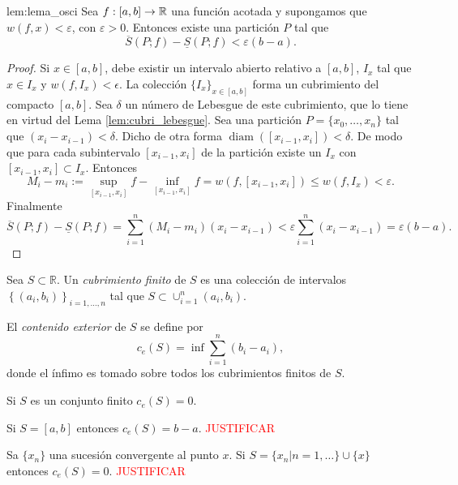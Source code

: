 \begin{lema}{lem:lema_osci} Sea $f:[a,b]\to\mathbb{R}$ una función acotada y supongamos que   $w(f,x)<\varepsilon$, con $\varepsilon>0$. Entonces existe una partición $P$ tal que 
\begin{equation}\label{eq:lema_oscila}
 \overline{S}(P;f)-\underline{S}(P;f)<\varepsilon(b-a).
\end{equation}
 
\end{lema}
\begin{proof} Si $x\in [a,b]$, debe existir un intervalo abierto relativo a $[a,b]$,  $I_x$ tal que $x\in I_x$ y $w(f,I_x)<\epsilon$. La colección $\{I_x\}_{x\in [a,b]}$ forma un cubrimiento del compacto $[a,b]$. Sea $\delta$ un número de Lebesgue de este cubrimiento, que lo tiene en virtud del Lema \ref{lem:cubri_lebesgue}. Sea una partición $P=\{x_0,\ldots,x_n\}$ tal que $(x_i-x_{i-1})<\delta$. Dicho de otra forma $\operatorname{diam}( [x_{i-1},x_i])<\delta$. De modo que para cada subintervalo $[x_{i-1},x_i]$ de la partición existe un $I_x$ con $[x_{i-1},x_i]\subset I_x$. Entonces 
\[
 M_i-m_i:=\sup\limits_{[x_{i-1},x_i]} f-\inf\limits_{[x_{i-1},x_i]} f=w(f,[x_{i-1},x_i])\leq w(f,I_x)<\varepsilon.
\]
Finalmente
\[
 \overline{S}(P;f)-\underline{S}(P;f)=\sum_{i=1}^n( M_i-m_i)(x_i-x_{i-1})<\varepsilon\sum_{i=1}^n(x_i-x_{i-1})=\varepsilon(b-a).
\]


 
\end{proof}





 \begin{definicion}{} Sea $S\subset\mathbb{R}$. Un \emph{cubrimiento finito} de $S$ es una colección de intervalos $\left\{ (a_i,b_i)\right\}_{i=1,\ldots,n}$ tal que $S\subset \cup_{i=1}^n(a_{i},b_i)$.
 
 El \emph{contenido exterior} de $S$ se define por 
 \[
  c_e(S)=\inf \sum_{i=1}^n (b_i-a_i),
 \]
donde el ínfimo es tomado sobre todos los cubrimientos finitos de $S$.
  
 \end{definicion}
 
 \begin{ejemplo}{} Si $S$ es un conjunto finito $c_e(S)=0$.
  
 \end{ejemplo}

 \begin{ejemplo}{} Si $S=[a,b]$ entonces  $c_e(S)=b-a$. \textcolor{red}{JUSTIFICAR}
    
 \end{ejemplo}
 \begin{ejemplo}{} Sa $\{x_n\}$ una sucesión convergente al punto $x$. Si $S=\{x_n| n=1,\dots\}\cup\{x\}$ entonces  $c_e(S)=0$. \textcolor{red}{JUSTIFICAR}
    
 \end{ejemplo}
 

